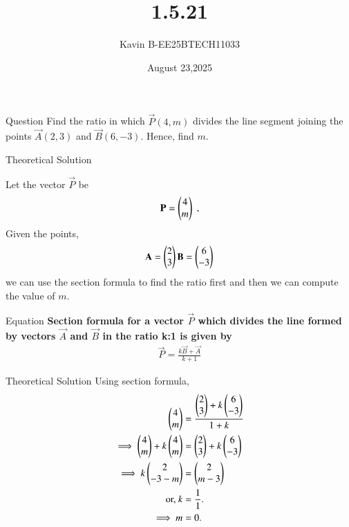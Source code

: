 \documentclass{beamer}
\begin{document}
\title 
{1.5.21}
\date{August 23,2025}


\author 
{Kavin B-EE25BTECH11033}






\frame{\titlepage}
\begin{frame}{Question}
Find the ratio in which $\vec{P}(4,m)$ divides the line segment joining the points $\vec{A}(2,3)$ and $\vec{B}(6,-3)$. Hence, find $m$.
\end{frame}



\begin{frame}{Theoretical Solution}

Let the vector $\vec{P}$ be 
\begin{align}
    \vec{P}=\begin{myvec}{4\\m}\end{myvec} \;, 
\end{align}
Given the points,
\begin{align}
    \vec{A}=\begin{myvec}{2\\3}\end{myvec}
    \vec{B}=\begin{myvec}{6\\-3}\end{myvec}
\end{align}
we can use the section formula to find the ratio first and then we can compute the value of $m$.\\

\end{frame}

\begin{frame}{Equation}
\textbf{Section formula for a vector $\vec{P}$ which divides the line formed by vectors $\vec{A}$ and $\vec{B}$ in the ratio k:1 is given by}
\begin{align}
    \vec{P}=\frac{k\vec{B}+\vec{A}}{k+1}
\end{align}
\end{frame}
\begin{frame}{Theoretical Solution}
Using section formula,\\
\begin{align}
         \begin{pmatrix}4\\m\end{pmatrix} &=\frac{{\begin{pmatrix}2\\3\end{pmatrix}+k\begin{pmatrix}6\\-3\end{pmatrix}}}{1+k}\\
    \implies\begin{pmatrix}4\\m\end{pmatrix} + k\begin{pmatrix}4\\m\end{pmatrix} &=\begin{pmatrix}2\\3\end{pmatrix}+k\begin{pmatrix}6\\-3\end{pmatrix}\\ 
	 \implies k\begin{pmatrix}2 \\ -3-m\end{pmatrix} &= \begin{pmatrix}2 \\ m-3\end{pmatrix}
	 \\
	 \text{or, } k &= \frac{1}{1}.\\
     \implies m &= 0.
\end{align}
\end{frame}
\end{document}
